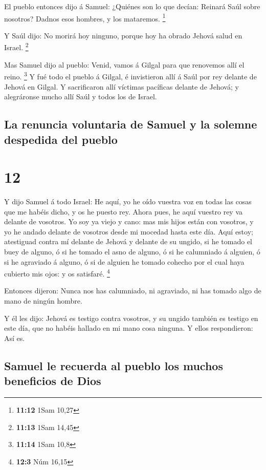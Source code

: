  El pueblo entonces dijo á Samuel: ¿Quiénes son lo que
decían: Reinará Saúl sobre nosotros? Dadnos esos hombres, y los
mataremos. \footnote{\textbf{11:12} 1Sam 10,27}

 Y Saúl dijo: No morirá hoy ninguno, porque hoy ha obrado
Jehová salud en Israel. \footnote{\textbf{11:13} 1Sam 14,45}

 Mas Samuel dijo al pueblo: Venid, vamos á Gilgal para
que renovemos allí el reino. \footnote{\textbf{11:14} 1Sam 10,8}
 Y fué todo el pueblo á Gilgal, é invistieron allí á Saúl
por rey delante de Jehová en Gilgal. Y sacrificaron allí víctimas
pacíficas delante de Jehová; y alegráronse mucho allí Saúl y todos los
de Israel.

\hypertarget{la-renuncia-voluntaria-de-samuel-y-la-solemne-despedida-del-pueblo}{%
\subsection{La renuncia voluntaria de Samuel y la solemne despedida del
pueblo}\label{la-renuncia-voluntaria-de-samuel-y-la-solemne-despedida-del-pueblo}}

\hypertarget{section-11}{%
\section{12}\label{section-11}}

 Y dijo Samuel á todo Israel: He aquí, yo he oído vuestra
voz en todas las cosas que me habéis dicho, y os he puesto rey.
 Ahora pues, he aquí vuestro rey va delante de vosotros.
Yo soy ya viejo y cano: mas mis hijos están con vosotros, y yo he andado
delante de vosotros desde mi mocedad hasta este día.  Aquí
estoy; atestiguad contra mí delante de Jehová y delante de su ungido, si
he tomado el buey de alguno, ó si he tomado el asno de alguno, ó si he
calumniado á alguien, ó si he agraviado á alguno, ó si de alguien he
tomado cohecho por el cual haya cubierto mis ojos: y os satisfaré.
\footnote{\textbf{12:3} Núm 16,15}

 Entonces dijeron: Nunca nos has calumniado, ni agraviado,
ni has tomado algo de mano de ningún hombre.

 Y él les dijo: Jehová es testigo contra vosotros, y su
ungido también es testigo en este día, que no habéis hallado en mi mano
cosa ninguna. Y ellos respondieron: Así es.

\hypertarget{samuel-le-recuerda-al-pueblo-los-muchos-beneficios-de-dios}{%
\subsection{Samuel le recuerda al pueblo los muchos beneficios de
Dios}\label{samuel-le-recuerda-al-pueblo-los-muchos-beneficios-de-dios}}

